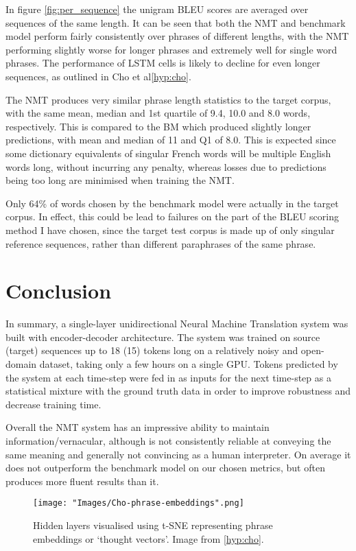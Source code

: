 \documentclass[]{article}
\begin{document}
In figure \ref{fig:per_sequence} the unigram BLEU scores are averaged over sequences of the same length. It can be seen that both the NMT and benchmark model perform fairly consistently over phrases of different lengths, with the NMT performing slightly worse for longer phrases and extremely well for single word phrases. The performance of LSTM cells is likely to decline for even longer sequences, as outlined in Cho et al\ref{hyp:cho}.

The NMT produces very similar phrase length statistics to the target corpus, with the same mean, median and 1st quartile of 9.4, 10.0 and 8.0 words, respectively. This is compared to the BM which produced slightly longer predictions, with mean and median of 11 and Q1 of 8.0. This is expected since some dictionary equivalents of singular French words will be multiple English words long, without incurring any penalty, whereas losses due to predictions being too long are minimised when training the NMT.


Only 64\% of words chosen by the benchmark model were actually in the target corpus. In effect, this could be lead to failures on the part of the BLEU scoring method I have chosen, since the target test corpus is made up of only singular reference sequences, rather than different paraphrases of the same phrase.






\section{Conclusion}
In summary, a single-layer unidirectional Neural Machine Translation system was built with encoder-decoder architecture. The system was trained on source (target) sequences up to 18 (15) tokens long on a relatively noisy and open-domain dataset, taking only a few hours on a single GPU. Tokens predicted by the system at each time-step were fed in as inputs for the next time-step as a statistical mixture with the ground truth data in order to improve robustness and decrease training time.

Overall the NMT system has an impressive ability to maintain information/vernacular, although is not consistently reliable at conveying the same meaning and generally not convincing as a human interpreter. On average it does not outperform the benchmark model on our chosen metrics, but often produces more fluent results than it.
\begin{figure}[h]
	\centering
		\texttt{[image: "Images/Cho-phrase-embeddings".png]}
	\caption{Hidden layers visualised using t-SNE representing phrase embeddings or `thought vectors'. Image from \ref{hyp:cho}. }
	\label{fig:phrase_representation}
\end{figure}
\end{document}
